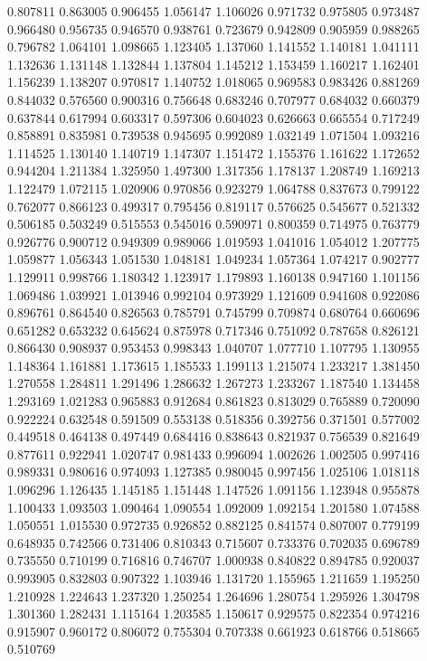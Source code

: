 0.807811
0.863005
0.906455
1.056147
1.106026
0.971732
0.975805
0.973487
0.966480
0.956735
0.946570
0.938761
0.723679
0.942809
0.905959
0.988265
0.796782
1.064101
1.098665
1.123405
1.137060
1.141552
1.140181
1.041111
1.132636
1.131148
1.132844
1.137804
1.145212
1.153459
1.160217
1.162401
1.156239
1.138207
0.970817
1.140752
1.018065
0.969583
0.983426
0.881269
0.844032
0.576560
0.900316
0.756648
0.683246
0.707977
0.684032
0.660379
0.637844
0.617994
0.603317
0.597306
0.604023
0.626663
0.665554
0.717249
0.858891
0.835981
0.739538
0.945695
0.992089
1.032149
1.071504
1.093216
1.114525
1.130140
1.140719
1.147307
1.151472
1.155376
1.161622
1.172652
0.944204
1.211384
1.325950
1.497300
1.317356
1.178137
1.208749
1.169213
1.122479
1.072115
1.020906
0.970856
0.923279
1.064788
0.837673
0.799122
0.762077
0.866123
0.499317
0.795456
0.819117
0.576625
0.545677
0.521332
0.506185
0.503249
0.515553
0.545016
0.590971
0.800359
0.714975
0.763779
0.926776
0.900712
0.949309
0.989066
1.019593
1.041016
1.054012
1.207775
1.059877
1.056343
1.051530
1.048181
1.049234
1.057364
1.074217
0.902777
1.129911
0.998766
1.180342
1.123917
1.179893
1.160138
0.947160
1.101156
1.069486
1.039921
1.013946
0.992104
0.973929
1.121609
0.941608
0.922086
0.896761
0.864540
0.826563
0.785791
0.745799
0.709874
0.680764
0.660696
0.651282
0.653232
0.645624
0.875978
0.717346
0.751092
0.787658
0.826121
0.866430
0.908937
0.953453
0.998343
1.040707
1.077710
1.107795
1.130955
1.148364
1.161881
1.173615
1.185533
1.199113
1.215074
1.233217
1.381450
1.270558
1.284811
1.291496
1.286632
1.267273
1.233267
1.187540
1.134458
1.293169
1.021283
0.965883
0.912684
0.861823
0.813029
0.765889
0.720090
0.922224
0.632548
0.591509
0.553138
0.518356
0.392756
0.371501
0.577002
0.449518
0.464138
0.497449
0.684416
0.838643
0.821937
0.756539
0.821649
0.877611
0.922941
1.020747
0.981433
0.996094
1.002626
1.002505
0.997416
0.989331
0.980616
0.974093
1.127385
0.980045
0.997456
1.025106
1.018118
1.096296
1.126435
1.145185
1.151448
1.147526
1.091156
1.123948
0.955878
1.100433
1.093503
1.090464
1.090554
1.092009
1.092154
1.201580
1.074588
1.050551
1.015530
0.972735
0.926852
0.882125
0.841574
0.807007
0.779199
0.648935
0.742566
0.731406
0.810343
0.715607
0.733376
0.702035
0.696789
0.735550
0.710199
0.716816
0.746707
1.000938
0.840822
0.894785
0.920037
0.993905
0.832803
0.907322
1.103946
1.131720
1.155965
1.211659
1.195250
1.210928
1.224643
1.237320
1.250254
1.264696
1.280754
1.295926
1.304798
1.301360
1.282431
1.115164
1.203585
1.150617
0.929575
0.822354
0.974216
0.915907
0.960172
0.806072
0.755304
0.707338
0.661923
0.618766
0.518665
0.510769
